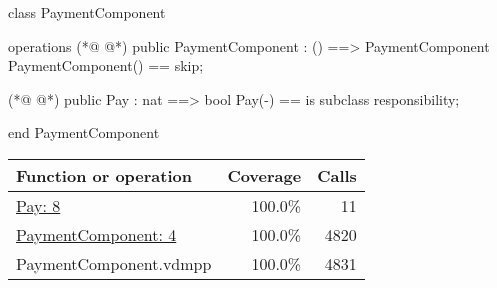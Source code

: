 \begin{vdmpp}
class PaymentComponent

operations
(*@
\label{PaymentComponent:4}
@*)
 public PaymentComponent : () ==> PaymentComponent
 PaymentComponent() == 
 skip;
 
(*@
\label{Pay:8}
@*)
 public Pay : nat ==> bool
 Pay(-) == is subclass responsibility;
 
end PaymentComponent
\end{vdmpp}
\bigskip
\begin{longtable}{|l|r|r|}
\hline
Function or operation & Coverage & Calls \\
\hline
\hline
\hyperref[Pay:8]{Pay: 8} & 100.0\% & 11 \\
\hline
\hyperref[PaymentComponent:4]{PaymentComponent: 4} & 100.0\% & 4820 \\
\hline
\hline
PaymentComponent.vdmpp & 100.0\% & 4831 \\
\hline
\end{longtable}

